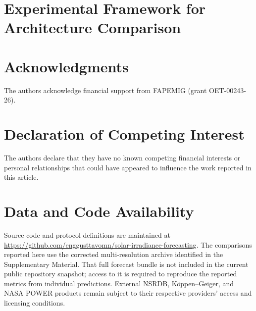 \documentclass[final,5p,times,twocolumn]{elsarticle}
\begin{document}




\section{Experimental Framework for Architecture Comparison}
\label{sec:proposed_approach}









\section*{Acknowledgments}
The authors acknowledge financial support from FAPEMIG (grant OET-00243-26).

\section*{Declaration of Competing Interest}
The authors declare that they have no known competing financial interests or
personal relationships that could have appeared to influence the work
reported in this article.

\section*{Data and Code Availability}
Source code and protocol definitions are maintained at
\url{https://github.com/enggusttavomn/solar-irradiance-forecasting}.
The comparisons reported here use the corrected multi-resolution archive
identified in the Supplementary Material. That full forecast bundle is not
included in the current public repository snapshot; access to it is required
to reproduce the reported metrics from individual predictions.
External NSRDB, K\"oppen--Geiger, and NASA POWER products remain subject to
their respective providers' access and licensing conditions.



\end{document}
